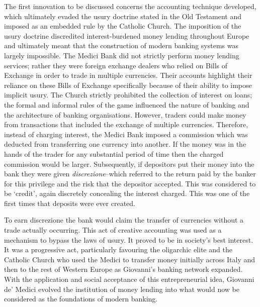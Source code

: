 The first innovation to be discussed concerns the accounting technique developed, which ultimately evaded the usury doctrine stated in the Old Testament and imposed as an embedded rule by the Catholic Church. The imposition of the usury doctrine discredited interest-burdened money lending throughout Europe and ultimately meant that the construction of modern banking systems was largely impossible. The Medici Bank did not strictly perform money lending services; rather they were foreign exchange dealers who relied on Bills of Exchange in order to trade in multiple currencies. Their accounts highlight their reliance on these Bills of Exchange specifically because of their ability to impose implicit usury. The Church strictly prohibited the collection of interest on loans; the formal and informal rules of the game influenced the nature of banking and the architecture of banking organisations. However, traders could make money from transactions that included the exchange of multiple currencies. Therefore, instead of charging interest, the Medici Bank imposed a commission which was deducted from transferring one currency into another. If the money was in the hands of the trader for any substantial period of time then the charged commission would be larger. Subsequently, if depositors put their money into the bank they were given \emph{discrezione}--which referred to the return paid by the banker for this privilege and the risk that the depositor accepted. This was considered to be `credit', again discretely concealing the interest charged. This was one of the first times that deposits were ever created.

To earn discrezione the bank would claim the transfer of currencies without a trade actually occurring. This act of creative accounting was used as a mechanism to bypass the laws of usury. It proved to be in society's best interest. It was a progressive act, particularly favouring the oligarchic elite and the Catholic Church who used the Medici to transfer money initially across Italy and then to the rest of Western Europe as Giovanni's banking network expanded. With the application and social acceptance of this entrepreneurial idea, Giovanni de' Medici evolved the institution of money lending into what would now be considered as the foundations of modern banking.

